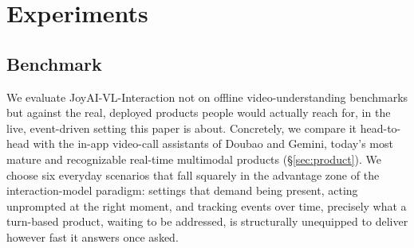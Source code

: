 \documentclass{llmxive}
\begin{document}
\section{Experiments}
\label{sec:experiments}
\subsection{Benchmark}\label{sec:benchmark}
We evaluate JoyAI-VL-Interaction not on offline video-understanding benchmarks but against the real, deployed products people would actually reach for, in the live, event-driven setting this paper is about. Concretely, we compare it head-to-head with the in-app video-call assistants of Doubao and Gemini, today's most mature and recognizable real-time multimodal products (\S\ref{sec:product}). We choose six everyday scenarios that fall squarely in the advantage zone of the interaction-model paradigm: settings that demand being present, acting unprompted at the right moment, and tracking events over time, precisely what a turn-based product, waiting to be addressed, is structurally unequipped to deliver however fast it answers once asked.
\end{document}
